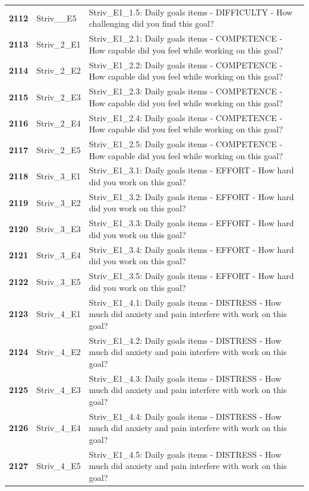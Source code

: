 \documentclass[
  letterpaper,
  DIV=11,
  numbers=noendperiod]{scrartcl}
\begin{document}
\begin{longtable}[t]{>{}cll}
\textbf{2112} & Striv\_\_E5 & Striv\_E1\_1.5: Daily goals items - DIFFICULTY - How challenging did you find this goal?\\
\textbf{2113} & Striv\_2\_E1 & Striv\_E1\_2.1: Daily goals items - COMPETENCE - How capable did you feel while working on this goal?\\
\textbf{2114} & Striv\_2\_E2 & Striv\_E1\_2.2: Daily goals items - COMPETENCE - How capable did you feel while working on this goal?\\
\textbf{2115} & Striv\_2\_E3 & Striv\_E1\_2.3: Daily goals items - COMPETENCE - How capable did you feel while working on this goal?\\
\addlinespace
\textbf{2116} & Striv\_2\_E4 & Striv\_E1\_2.4: Daily goals items - COMPETENCE - How capable did you feel while working on this goal?\\
\textbf{2117} & Striv\_2\_E5 & Striv\_E1\_2.5: Daily goals items - COMPETENCE - How capable did you feel while working on this goal?\\
\textbf{2118} & Striv\_3\_E1 & Striv\_E1\_3.1: Daily goals items - EFFORT - How hard did you work on this goal?\\
\textbf{2119} & Striv\_3\_E2 & Striv\_E1\_3.2: Daily goals items - EFFORT - How hard did you work on this goal?\\
\textbf{2120} & Striv\_3\_E3 & Striv\_E1\_3.3: Daily goals items - EFFORT - How hard did you work on this goal?\\
\addlinespace
\textbf{2121} & Striv\_3\_E4 & Striv\_E1\_3.4: Daily goals items - EFFORT - How hard did you work on this goal?\\
\textbf{2122} & Striv\_3\_E5 & Striv\_E1\_3.5: Daily goals items - EFFORT - How hard did you work on this goal?\\
\textbf{2123} & Striv\_4\_E1 & Striv\_E1\_4.1: Daily goals items - DISTRESS - How much did anxiety and pain interfere with work on this goal?\\
\textbf{2124} & Striv\_4\_E2 & Striv\_E1\_4.2: Daily goals items - DISTRESS - How much did anxiety and pain interfere with work on this goal?\\
\textbf{2125} & Striv\_4\_E3 & Striv\_E1\_4.3: Daily goals items - DISTRESS - How much did anxiety and pain interfere with work on this goal?\\
\addlinespace
\textbf{2126} & Striv\_4\_E4 & Striv\_E1\_4.4: Daily goals items - DISTRESS - How much did anxiety and pain interfere with work on this goal?\\
\textbf{2127} & Striv\_4\_E5 & Striv\_E1\_4.5: Daily goals items - DISTRESS - How much did anxiety and pain interfere with work on this goal?\\

\end{longtable}
\end{document}
